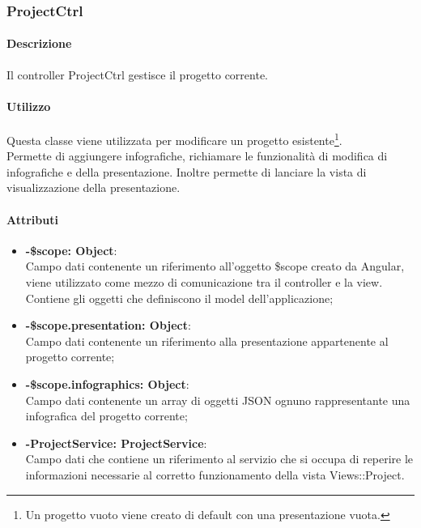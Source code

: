 \subsubsection{ProjectCtrl}
	\paragraph{Descrizione}
	Il controller ProjectCtrl gestisce il progetto corrente.
	
	\paragraph{Utilizzo}
	Questa classe viene utilizzata per modificare un progetto esistente\footnote{Un progetto vuoto viene creato di default con una presentazione vuota.}.\\
	Permette di aggiungere infografiche, richiamare le funzionalità di modifica di infografiche e della presentazione. Inoltre permette di lanciare la vista di visualizzazione della presentazione.
	\paragraph{Attributi}
	\begin{itemize}
		\item \textbf{-\$scope: Object}:\\
			Campo dati contenente un riferimento all'oggetto \$scope creato da Angular, viene utilizzato come mezzo di comunicazione tra il controller e la view. Contiene gli oggetti che definiscono il model dell'applicazione;
		\item \textbf{-\$scope.presentation: Object}:\\
			Campo dati contenente un riferimento alla presentazione appartenente al progetto corrente;
		\item \textbf{-\$scope.infographics: Object}:\\
			Campo dati contenente un array di oggetti JSON ognuno rappresentante una infografica del progetto corrente;	
		\item \textbf{-ProjectService: ProjectService}:\\
			Campo dati che contiene un riferimento al servizio che si occupa di reperire le informazioni necessarie al corretto funzionamento della vista Views::Project.
	\end{itemize}
	
